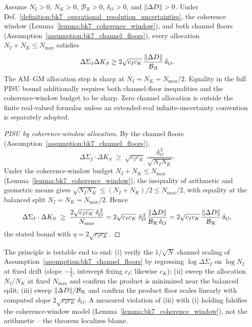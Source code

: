 \begin{theorem}
\label{theorem:bk7_pisu}
Assume $N_I>0$, $N_K>0$, $\mathcal B_R>0$, $\delta_O>0$, and
$\lVert\Delta D\rVert>0$.  Under
Def.~\ref{definition:bk7_operational_resolution_uncertainties}, the coherence
window (Lemma~\ref{lemma:bk7_coherence_window}), and both channel floors
(Assumption~\ref{assumption:bk7_channel_floors}), every allocation
$N_I+N_K\leq N_{\max}$ satisfies
\[
 \Delta\Sigma_I\Delta K_S\geq
 2\sqrt{c_Ic_K}\,
 \frac{\lVert\Delta D\rVert}{\mathcal B_R}\,\delta_O.
\]
The AM--GM allocation step is sharp at $N_I=N_K=N_{\max}/2$.  Equality in the
full PISU bound additionally requires both channel-floor inequalities and the
coherence-window budget to be sharp.  Zero channel allocation is outside the
finite real-valued formulas unless an extended-real infinite-uncertainty
convention is separately adopted.
\end{theorem}

\begin{proof}[PISU by coherence-window allocation]
\label{proof:bk7_pisu}
\leavevmode
By the channel floors (Assumption~\ref{assumption:bk7_channel_floors}),
\[
\Delta\Sigma_I \cdot \Delta K_S \;\ge\; \sqrt{c_I c_K}\;\frac{\delta_O^{\,2}}{\sqrt{N_I N_K}}.
\]
Under the coherence-window budget $N_I + N_K \le N_{\max}$ (Lemma~\ref{lemma:bk7_coherence_window}), the inequality of arithmetic and geometric means gives $\sqrt{N_I N_K} \le (N_I + N_K)/2 \le N_{\max}/2$, with equality at the balanced split $N_I = N_K = N_{\max}/2$. Hence
\[
\Delta\Sigma_I \cdot \Delta K_S \;\ge\; \frac{2\sqrt{c_I c_K}\;\delta_O^{\,2}}{N_{\max}} = 2\sqrt{c_I c_K}\;\delta_O^{\,2}\,\frac{\|\Delta D\|}{\mathcal{B_R}\,\delta_O} = 2\sqrt{c_I c_K}\,\frac{\|\Delta D\|}{\mathcal{B_R}}\,\delta_O,
\]
the stated bound with $\eta = 2\sqrt{c_I c_K}$.
\end{proof}

\begin{remark}
\label{remark:bk7_pisu_protocol}
The principle is testable end to end: (i) verify the $1/\sqrt{N}$ channel scaling of Assumption~\ref{assumption:bk7_channel_floors} by regressing $\log\Delta\Sigma_I$ on $\log N_I$ at fixed drift (slope $-\tfrac{1}{2}$, intercept fixing $c_I$; likewise $c_K$); (ii) sweep the allocation $N_I/N_K$ at fixed $N_{\max}$ and confirm the product is minimized near the balanced split; (iii) sweep $\|\Delta D\|/\mathcal{B_R}$ and confirm the product floor scales linearly with computed slope $2\sqrt{c_I c_K}\,\delta_O$. A measured violation of (iii) with (i) holding falsifies the coherence-window model (Lemma~\ref{lemma:bk7_coherence_window}), not the arithmetic -- the theorem localizes blame.
\end{remark}

